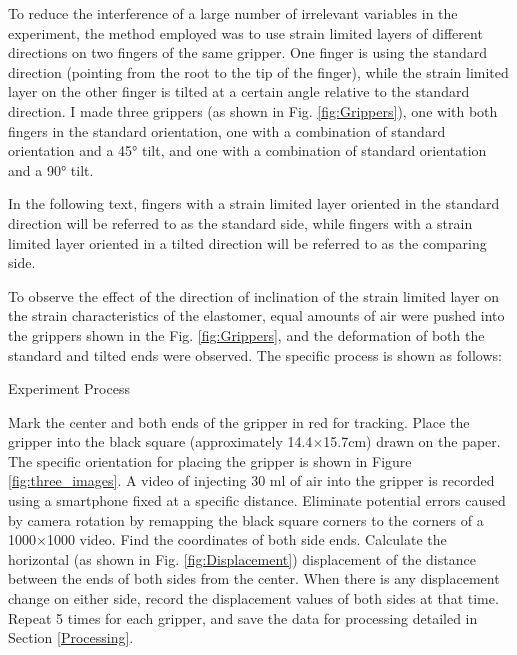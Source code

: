 \documentclass[conference]{IEEEtran}
\begin{document}
To reduce the interference of a large number of irrelevant variables in the experiment, the method employed was to use strain limited layers of different directions on two fingers of the same gripper. One finger is using the standard direction (pointing from the root to the tip of the finger), while the strain limited layer on the other finger is tilted at a certain angle relative to the standard direction. I made three grippers (as shown in Fig. \ref{fig:Grippers}), one with both fingers in the standard orientation, one with a combination of standard orientation and a 45° tilt, and one with a combination of standard orientation and a 90° tilt. 

In the following text, fingers with a strain limited layer oriented in the standard direction will be referred to as the standard side, while fingers with a strain limited layer oriented in a tilted direction will be referred to as the comparing side.

To observe the effect of the direction of inclination of the strain limited layer on the strain characteristics of the elastomer, equal amounts of air were pushed into the grippers shown in the Fig. \ref{fig:Grippers}, and the deformation of both the standard and tilted ends were observed. The specific process is shown as follows:

\begin{algorithm}
\label{Algorithm}
	\caption{Experiment Process}\label{pseudo:ExperimentProcess}
	\begin{algorithmic}[1]
            \State Mark the center and both ends of the gripper in red for tracking.
            \State Place the gripper into the black square (approximately 14.4$\times$15.7cm) drawn on the paper. The specific orientation for placing the gripper is shown in Figure \ref{fig:three_images}.
            \State A video of injecting 30 ml of air into the gripper is recorded using a smartphone fixed at a specific distance.
            \State Eliminate potential errors caused by camera rotation by remapping the black square corners to the corners of a 1000$\times$1000 video. 
            \State Find the coordinates of both side ends.
            \State Calculate the horizontal (as shown in Fig. \ref{fig:Displacement}) displacement of the distance between the ends of both sides from the center.
            \State When there is any displacement change on either side, record the displacement values of both sides at that time.
            \State Repeat 5 times for each gripper, and save the data for processing detailed in Section \ref{Processing}.
	\end{algorithmic} 
\end{algorithm}
\end{document}
